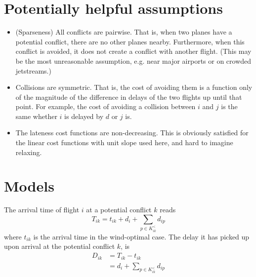 \documentclass{article}
\begin{document}
\section{Potentially helpful assumptions}
\begin{itemize}
\item (Sparseness) All conflicts are pairwise. That is, when two planes have a potential conflict, there are no other planes nearby. 
Furthermore, when this conflict is avoided, it does not create a conflict with another flight. 
(This may be the most unreasonable assumption, e.g. near major airports or on crowded jetstreams.)
\item Collisions are symmetric. That is, the cost of avoiding them is a function only of the magnitude of the difference in delays of the two flights up until that point. For example, the cost of avoiding a collision between $i$ and $j$ is the same whether $i$ is delayed by $d$ or $j$ is.
\item The lateness cost functions are non-decreasing.
This is obviously satisfied for the linear cost functions with unit slope used
here, and hard to imagine relaxing.
\end{itemize}

\section{Models}
\label{sec:models}
The arrival time of flight $i$ at a potential conflict $k$ reads 
\begin{equation*}
    T_{ik} = t_{ik} + d_i + \sum_{p \in K^<_{ik}} d_{ip}
\end{equation*}
where $t_{ik}$ is the arrival time in the wind-optimal case.
The delay it has picked up upon arrival at the potential conflict $k$, is
\begin{align*}
    D_{ik} &= T_{ik} - t_{ik} \\
           &= d_i + \sum_{p \in K^<_{ik}} d_{ip}
\end{align*}
\end{document}
